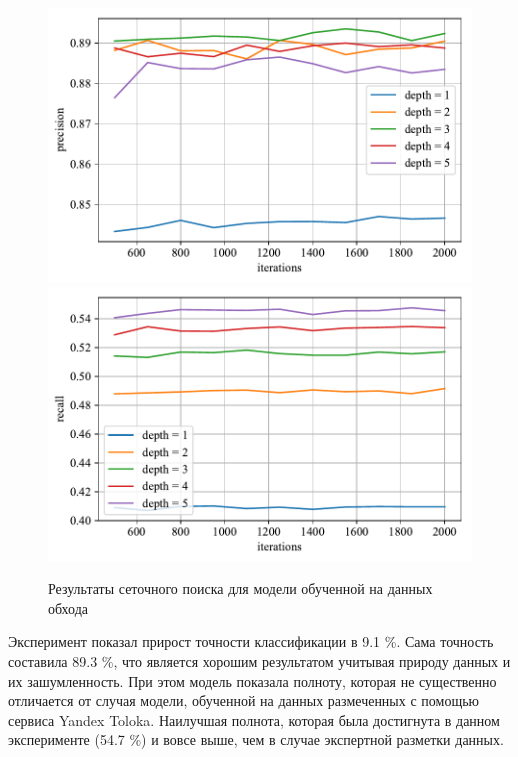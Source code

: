 \begin{figure}
    \centering
    \includegraphics{../images/model_factory_precision.pdf}
    \includegraphics{../images/model_factory_recall.pdf}
    \caption{Результаты сеточного поиска для модели обученной на данных обхода}
    \label{fig:model_factory}
\end{figure}

Эксперимент показал прирост точности классификации в 9.1 \%. Сама точность составила 89.3 \%, что является хорошим результатом учитывая природу данных и их зашумленность. При этом модель показала полноту, которая не существенно отличается от случая модели, обученной на данных размеченных с помощью сервиса Yandex Toloka. Наилучшая полнота, которая была достигнута в данном эксперименте (54.7 \%) и вовсе выше, чем в случае экспертной разметки данных.